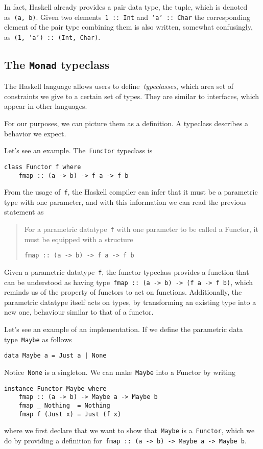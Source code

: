 \documentclass[../TFG.tex]{subfiles}
\begin{document}
In fact, Haskell already provides a pair data type, the tuple, which is denoted
as~\texttt{(a, b)}. Given two elements~\texttt{1 ::
Int} and~\texttt{'a' :: Char} the corresponding element of the pair
type combining them is also written, somewhat confusingly,
as~\texttt{(1, 'a') :: (Int, Char)}.

\subsection{The \texorpdfstring{\texttt{Monad}}{Monad} typeclass}
The Haskell language allows users to define~\emph{typeclasses}, which area set
of constraints we give to a certain set of types.
They are similar to interfaces, which appear in other languages.

For our purposes, we can picture them as a definition. A typeclass describes a
behavior we expect.

Let's see an example. The~\texttt{Functor} typeclass is
\begin{verbatim}
class Functor f where
    fmap :: (a -> b) -> f a -> f b
\end{verbatim}
From the usage of~\texttt{f}, the Haskell compiler can infer
that it must be a parametric type with one parameter, and
with this information we can read the previous statement as
\begin{quote}
    For a parametric datatype~\texttt{f} with one parameter to be
    called a Functor, it must be equipped with a structure

    \texttt{fmap :: (a -> b) -> f a -> f b}
\end{quote}
Given a parametric datatype~\texttt{f}, the functor typeclass
provides a function that can be understood as having
type~\texttt{fmap :: (a -> b) -> (f a -> f b)}, which reminds us of
the property of functors to act on functions. Additionally, the parametric
datatype itself acts on types, by transforming an existing type into a new one,
behaviour similar to that of a functor.

Let's see an example of an implementation. If we define the parametric data
type~\texttt{Maybe} as follows
\begin{verbatim}
data Maybe a = Just a | None
\end{verbatim}
Notice~\texttt{None} is a singleton.
We can make~\texttt{Maybe} into a Functor by writing
\begin{verbatim}
instance Functor Maybe where
    fmap :: (a -> b) -> Maybe a -> Maybe b
    fmap _ Nothing  = Nothing
    fmap f (Just x) = Just (f x)
\end{verbatim}
where we first declare that we want to show that~\texttt{Maybe} is
a~\texttt{Functor}, which we do by providing a definition
for~\texttt{fmap :: (a -> b) -> Maybe a -> Maybe b}.
\end{document}
